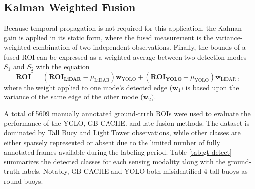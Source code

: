 \documentclass{erauthesis}
\begin{document}
\subsection{Kalman Weighted Fusion} \label{Kalman_Weighted_Fusion}

Because temporal propagation is not required for this application, the Kalman gain is applied in its static form, where the fused measurement is the variance-weighted combination of two independent observations.
Finally, the bounds of a fused ROI can be expressed as a weighted average between two detection modes $S_1$ and $S_2$ with the equation
\begin{equation}
\boldsymbol{R O I}^*=\left(\boldsymbol{R O I _ { \text{LiDAR} }}-\mu_\text{LiDAR}\right) \mathbf{w}_\text{YOLO}+\left(\boldsymbol{R O I _ { \text{YOLO} }}-\mu_\text{YOLO}\right) \mathbf{w}_\text{LiDAR} \, , \label{Kalman_correction}
\end{equation}
where the weight applied to one mode's detected edge ($\boldsymbol{w}_1$) is based upon the variance of the same edge of the other mode ($\boldsymbol{w}_2$).



A total of 5609 manually annotated ground-truth ROIs were used to evaluate the performance of the YOLO, GB-CACHE, and late-fusion methods. 
The dataset is dominated by Tall Buoy and Light Tower observations, while other classes are either sparsely represented or absent due to the limited number of fully annotated frames available during the labeling period. 
Table \ref{tab:gt-detect} summarizes the detected classes for each sensing modality along with the ground-truth labels. Notably, GB-CACHE and YOLO both misidentified 4 tall buoys as round buoys.
\end{document}
